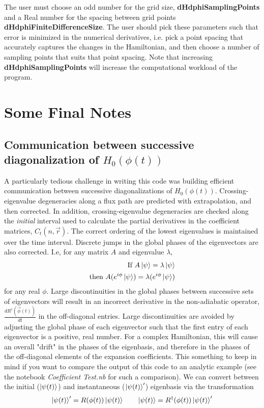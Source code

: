 \documentclass[12pt]{article}
\begin{document}
The user must choose an odd number for the grid size, \textbf{dHdphiSamplingPoints} and a Real number for the spacing between grid points \textbf{dHdphiFiniteDifferenceSize}.
\newline
\newline
The user should pick these parameters such that error is minimized in the numerical derivatives, i.e. pick a point spacing that accurately captures the changes in the Hamiltonian, and then choose a number of sampling points that suits that point spacing. Note that increasing \textbf{dHdphiSamplingPoints} will increase the computational workload of the program. 
\section{Some Final Notes}
\subsection{Communication between successive diagonalization of $H_0(\phi(t))$}
A particularly tedious challenge in writing this code was building efficient communication between successive diagonalizations of $H_0(\phi(t))$. Crossing-eigenvalue degeneracies along a flux path are predicted with extrapolation, and then corrected. In addition, crossing-eigenvalue degeneracies are checked along the \textit{initial} interval used to calculate the partial derivatives in the coefficient matrices, $C_t(n,\vec{r})$. The correct ordering of the lowest eigenvalues is maintained over the time interval.
\newline
\newline
Discrete jumps in the global phases of the eigenvectors are also corrected. I.e, for any matrix $A$ and eigenvalue $\lambda$,
\begin{equation}
\begin{split}
\mbox{If } A \ket{\psi} = \lambda \ket{\psi} \\
\mbox{then } A (e^{i \phi} \ket{\psi}) = \lambda (e^{i \phi} \ket{\psi})
\end{split}
\end{equation}
for any real $\phi$. Large discontinuities in the global phases between successive sets of eigenvectors will result in an incorrect derivative in the non-adiabatic operator, $ \frac{d R^\dagger(\vec{\phi}(t))}{d t} $ in the off-diagonal entries. Large discontinuities are avoided by adjusting the global phase of each eigenvector such that the first entry of each eigenvector is a positive, real number. For a complex Hamiltonian, this will cause an overall "drift" in the phases of the eigenbasis, and therefore in the phases of the off-diagonal elements of the expansion coefficients. This something to keep in mind if you want to compare the output of this code to an analytic example (see the notebook \textit{Coefficient Test.nb} for such a comparison).
 We can convert between the initial ($\ket{\psi(t)}$) and instantaneous ($\ket{\psi(t)}'$) eigenbasis via the transformation
\begin{equation}
\ket{\psi(t)}' = R(\phi(t)) \ket{\psi(t)} \quad \quad \ket{\psi(t)} = R^\dagger (\phi(t)) \ket{\psi(t)}'
\end{equation}
\end{document}
